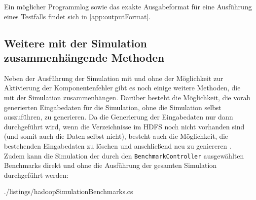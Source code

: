 Ein möglicher Programmlog sowie das exakte Ausgabeformat für eine Ausführung eines Testfalls findet sich in \autoref{app:outputFormat}.

\subsection{Weitere mit der Simulation zusammenhängende Methoden}
\label{sec:simulationUtilities}

Neben der Ausführung der Simulation mit und ohne der Möglichkeit zur Aktivierung der Komponentenfehler gibt es noch einige weitere Methoden, die mit der Simulation zusammenhängen.
Darüber besteht die Möglichkeit, die vorab generierten Eingabedaten für die Simulation, ohne die Simulation selbst auszuführen, zu generieren.
Da die Generierung der Eingabedaten nur dann durchgeführt wird, wenn die Verzeichnisse im \ac{HDFS} noch nicht vorhanden sind (und somit auch die Daten selbst nicht), besteht auch die Möglichkeit, die bestehenden Eingabedaten zu löschen und anschließend neu zu geniereren .
Zudem kann die Simulation der durch den \texttt{BenchmarkController} ausgewählten Benchmarks direkt und ohne die Ausführung der gesamten Simulation durchgeführt werden:


{./listings/hadoopSimulationBenchmarks.cs}
